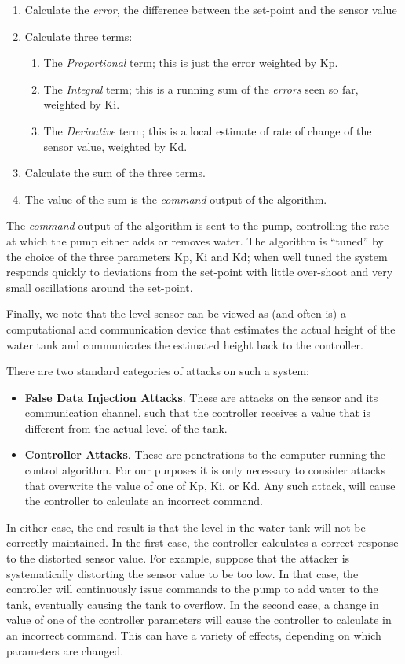 \documentclass[conference]{IEEEtran}
\begin{document}
\begin{enumerate}
\item Calculate the {\em error}, the difference between the set-point and the sensor value
\item Calculate three terms:
 \begin{enumerate}
    \item The {\em Proportional} term; this is just the error weighted by Kp.
    \item  The {\em Integral} term; this is a running sum of the {\em errors} seen so far, weighted by Ki.
    \item The {\em Derivative} term; this is a local estimate of rate of change of the sensor value, weighted by Kd.
 \end {enumerate}
\item Calculate the sum of the three terms.
\item The value of the sum is the {\em command} output of the algorithm.
\end {enumerate}

The {\em command} output of the algorithm is sent to the pump, controlling the rate at which the pump either adds or removes water.  The algorithm is ``tuned'' by the choice of the three parameters Kp, Ki  and Kd; when well tuned the system responds quickly to deviations from the set-point with little over-shoot and very small oscillations around the set-point. 


Finally, we note that the level sensor can be viewed as (and often is) a computational and communication device that estimates the actual height of the water tank and communicates the estimated height back to the controller. 

There are two standard categories of attacks on such a system: 
\begin{itemize}
\item {\bf False Data Injection Attacks}.  These are attacks on the sensor and its communication channel, such that the controller receives a value that is different from the actual level of the tank.
\item {\bf Controller Attacks}.  These are penetrations to the computer running the control algorithm. For our purposes it is only necessary to consider attacks that overwrite the value of one of Kp, Ki, or Kd.  Any such attack, will cause the controller to calculate an incorrect command.
\end{itemize}

In either case, the end result is that the level in the water tank will not be correctly maintained. In the first case, the controller calculates a correct response to the distorted sensor value.  For example, suppose that the attacker is systematically distorting the sensor value to be too low. In that case, the controller will continuously issue commands to the pump to add water to the tank, eventually causing the tank to overflow. In the second case, a change in value of one of the controller parameters will cause the controller to calculate in an incorrect command. This can have a variety of effects, depending on which parameters are changed.  
\end{document}
